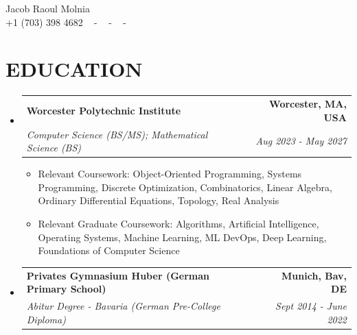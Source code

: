 \documentclass[letterpaper,11pt]{article}
\makeatletter
\newcommand{\resumeItem}[1]{
  \item\small{
    {#1 \vspace{-1pt}}
  }
}
\newcommand{\resumeSubheading}[4]{
  \vspace{-2pt}\item
    \begin{tabular*}{1.0\textwidth}[t]{l@{\extracolsep{\fill}}r}
      \textbf{\large#1} & \textbf{\small #2} \\
      \textit{\large#3} & \textit{\small #4} \\
      
    \end{tabular*}\vspace{-7pt}
}
\newcommand{\resumeSubHeadingListStart}{\begin{itemize}[leftmargin=0.0in, label={}]}
\newcommand{\resumeSubHeadingListEnd}{\end{itemize}}
\newcommand{\resumeItemListStart}{\begin{itemize}[leftmargin=0.1in]}
\newcommand{\resumeItemListEnd}{\end{itemize}\vspace{-5pt}}
\makeatother
\begin{document}


\begin{center}
    {\huge Jacob Raoul Molnia} \\ \vspace{2pt} 
    {+1 (703) 398 4682} ~ 
    \small{-}
    \href{mailto:jmolnia04@gmail.com}{\color{blue}{jacob@molnia.net}} ~ 
    \small{-}
    \href{https://www.linkedin.com/in/jacob-molnia/}{ \color{blue}{linkedin.com/in/jacob-molnia}}  ~
    \small{-}
    \href{https://github.com/jake-molnia}{ \color{blue}{github.com/jake-molnia}} ~
    \vspace{-7pt}
\end{center}

\section{\color{airforceblue}EDUCATION}
  \resumeSubHeadingListStart

    \resumeSubheading
      {Worcester Polytechnic Institute}{Worcester, MA, USA}
      {Computer Science (BS/MS); Mathematical Science (BS)}{Aug 2023 - May 2027}
      \resumeItemListStart
      \resumeItem{Relevant Coursework: Object-Oriented Programming, Systems Programming, Discrete Optimization, Combinatorics, Linear Algebra, Ordinary Differential Equations, Topology, Real Analysis}
      \resumeItem{Relevant Graduate Coursework: Algorithms, Artificial Intelligence, Operating Systems, Machine Learning, ML DevOps, Deep Learning, Foundations of Computer Science}
    \resumeItemListEnd
    
    \vspace{-4pt}
     \resumeSubheading
        {Privates Gymnasium Huber (German Primary School)}{Munich, Bav, DE}
        {Abitur Degree - Bavaria (German Pre-College Diploma)}{Sept 2014 - June 2022}
  \resumeSubHeadingListEnd
  \vspace{-10pt}

\end{document}
